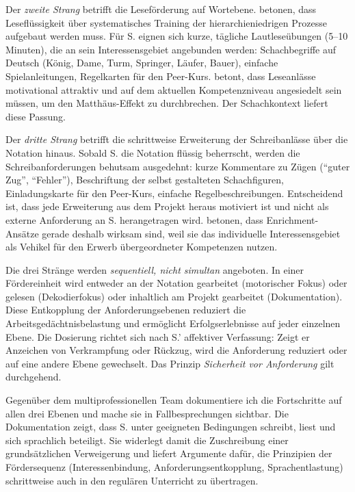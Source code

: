 \documentclass[ngerman, a4paper]{article}
\begin{document}
Der \textit{zweite Strang} betrifft die Leseförderung auf Wortebene. \textcite[Kap.\,1--4]{rosebrock2010grundlagen}
betonen, dass Leseflüssigkeit über systematisches Training der
hierarchieniedrigen Prozesse aufgebaut werden muss.
Für S. eignen sich kurze, tägliche
Lautleseübungen (5--10 Minuten), die an sein Interessensgebiet angebunden werden:
Schachbegriffe auf Deutsch (König, Dame, Turm, Springer, Läufer, Bauer),
einfache Spielanleitungen, Regelkarten für den Peer-Kurs. \textcite[Kap.\,1--4]{gold2018lesenkannmanlernen} betont, dass
Leseanlässe motivational attraktiv und auf dem aktuellen Kompetenzniveau
angesiedelt sein müssen, um den Matthäus-Effekt zu durchbrechen. Der Schachkontext liefert diese Passung.

Der \textit{dritte Strang} betrifft die schrittweise Erweiterung der
Schreibanlässe über die Notation hinaus. Sobald S. die Notation flüssig beherrscht,
werden die Schreibanforderungen behutsam ausgedehnt: kurze Kommentare zu
Zügen (\enquote{guter Zug}, \enquote{Fehler}), Beschriftung der selbst gestalteten
Schachfiguren, Einladungskarte für den Peer-Kurs, einfache Regelbeschreibungen.
Entscheidend ist, dass jede Erweiterung aus dem Projekt heraus motiviert ist
und nicht als externe Anforderung an S. herangetragen wird. \textcite[S.\,254--273]{fischer2020begabungsfoerderung}
betonen, dass Enrichment-Ansätze gerade deshalb wirksam sind, weil sie das
individuelle Interessensgebiet als Vehikel für den Erwerb übergeordneter
Kompetenzen nutzen.

Die drei Stränge werden \textit{sequentiell, nicht simultan} angeboten. In einer
Fördereinheit wird entweder an der Notation gearbeitet (motorischer Fokus)
oder gelesen (Dekodierfokus) oder inhaltlich am Projekt gearbeitet
(Dokumentation). Diese Entkopplung der Anforderungsebenen reduziert die
Arbeitsgedächtnisbelastung und ermöglicht Erfolgserlebnisse auf jeder
einzelnen Ebene. Die Dosierung richtet sich nach S.' affektiver Verfassung:
Zeigt er Anzeichen von Verkrampfung oder Rückzug, wird die Anforderung
reduziert oder auf eine andere Ebene gewechselt. Das Prinzip
\textit{Sicherheit vor Anforderung} gilt durchgehend.

Gegenüber dem multiprofessionellen Team dokumentiere ich die Fortschritte
auf allen drei Ebenen und mache sie in Fallbesprechungen sichtbar. Die
Dokumentation zeigt, dass S. unter geeigneten Bedingungen schreibt, liest
und sich sprachlich beteiligt. Sie widerlegt damit die Zuschreibung einer
grundsätzlichen Verweigerung und liefert Argumente dafür, die Prinzipien
der Fördersequenz (Interessenbindung, Anforderungsentkopplung,
Sprachentlastung) schrittweise auch in den regulären Unterricht zu übertragen.
\end{document}
